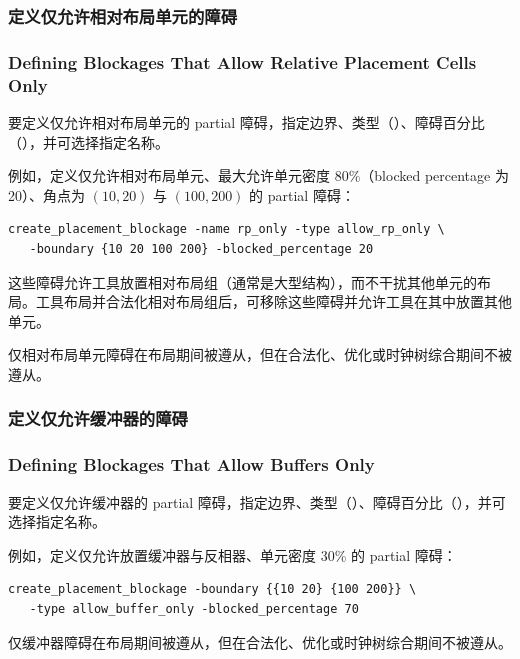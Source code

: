 \subsubsection{定义仅允许相对布局单元的障碍}
\subsubsection*{Defining Blockages That Allow Relative Placement Cells Only}

要定义仅允许相对布局单元的 partial 障碍，指定边界、类型（）、障碍百分比（），并可选择指定名称。

例如，定义仅允许相对布局单元、最大允许单元密度 80\%（blocked percentage 为 20）、角点为 $(10, 20)$ 与 $(100, 200)$ 的 partial 障碍：
\begin{lstlisting}
create_placement_blockage -name rp_only -type allow_rp_only \
   -boundary {10 20 100 200} -blocked_percentage 20
\end{lstlisting}

这些障碍允许工具放置相对布局组（通常是大型结构），而不干扰其他单元的布局。工具布局并合法化相对布局组后，可移除这些障碍并允许工具在其中放置其他单元。

\begin{noteBox}
仅相对布局单元障碍在布局期间被遵从，但在合法化、优化或时钟树综合期间不被遵从。
\end{noteBox}

\subsubsection{定义仅允许缓冲器的障碍}
\subsubsection*{Defining Blockages That Allow Buffers Only}

要定义仅允许缓冲器的 partial 障碍，指定边界、类型（）、障碍百分比（），并可选择指定名称。

例如，定义仅允许放置缓冲器与反相器、单元密度 30\% 的 partial 障碍：
\begin{lstlisting}
create_placement_blockage -boundary {{10 20} {100 200}} \
   -type allow_buffer_only -blocked_percentage 70
\end{lstlisting}

\begin{noteBox}
仅缓冲器障碍在布局期间被遵从，但在合法化、优化或时钟树综合期间不被遵从。
\end{noteBox}

